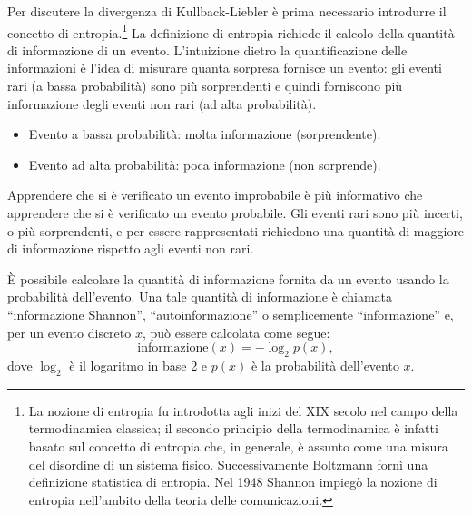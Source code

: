 \documentclass[
  10pt,
  italian,
  a4paper,
  extrafontsizes,onecolumn,openright
  ]{memoir}
\providecommand{\tightlist}{%
  \setlength{\itemsep}{0pt}\setlength{\parskip}{0pt}}
\theoremstyle{definition}
\theoremstyle{definition}
\theoremstyle{definition}
\theoremstyle{definition}
\theoremstyle{remark}
\begin{document}
Per discutere la divergenza di Kullback-Liebler è prima necessario introdurre il concetto di entropia.\footnote{La nozione di entropia fu introdotta agli inizi del XIX secolo nel campo della termodinamica classica; il secondo principio della termodinamica è infatti basato sul concetto di entropia che, in generale, è assunto come una misura del disordine di un sistema fisico. Successivamente Boltzmann fornì una definizione statistica di entropia. Nel 1948 Shannon impiegò la nozione di entropia nell'ambito della teoria delle comunicazioni.} La definizione di entropia richiede il calcolo della quantità di informazione di un evento. L'intuizione dietro la quantificazione delle informazioni è l'idea di misurare quanta sorpresa fornisce un evento: gli eventi rari (a bassa probabilità) sono più sorprendenti e quindi forniscono più informazione degli eventi non rari (ad alta probabilità).

\begin{itemize}
\tightlist
\item
  Evento a bassa probabilità: molta informazione (sorprendente).
\item
  Evento ad alta probabilità: poca informazione (non sorprende).
\end{itemize}

\noindent
Apprendere che si è verificato un evento improbabile è più informativo che apprendere che si è verificato un evento probabile. Gli eventi rari sono più incerti, o più sorprendenti, e per essere rappresentati richiedono una quantità di maggiore di informazione rispetto agli eventi non rari.

È possibile calcolare la quantità di informazione fornita da un evento usando la probabilità dell'evento. Una tale quantità di informazione è chiamata ``informazione Shannon'', ``autoinformazione'' o semplicemente ``informazione'' e, per un evento discreto \(x\), può essere calcolata come segue:
\[
\text{informazione}(x) = -\log_2 p(x),
\]
dove \(\log_2\) è il logaritmo in base 2 e \(p(x)\) è la probabilità dell'evento \(x\).
\end{document}
